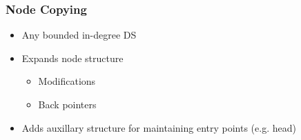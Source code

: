 \documentclass[compress]{beamer}
\begin{document}
\begin{frame}
\frametitle{Node Copying}
\begin{itemize}
  \item Any bounded in-degree DS \cite{Driscoll198986}
  \item Expands node structure
  \begin{itemize}
    \item Modifications
    \item Back pointers
  \end{itemize}
  \item Adds auxillary structure for maintaining entry points (e.g. head)
\end{itemize}
\pause
\begin{figure}
\center
{}

\end{figure}
\end{frame}
\end{document}
